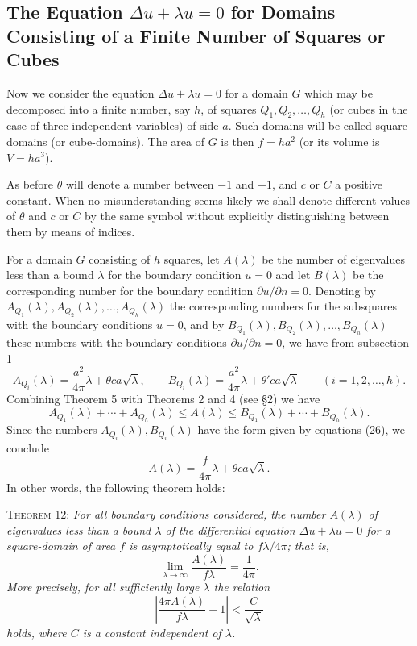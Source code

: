 \subsection{The Equation $\Delta u+\lambda u=0$ for Domains Consisting of a Finite Number of Squares or Cubes}
Now we consider the equation $\Delta u+\lambda u=0$ for a domain $G$ which may be decomposed into a finite number, say $h$, of squares $Q_1,Q_2,\ldots,Q_h$ (or cubes in the case of three independent variables) of side $a$. Such domains will be called square-domains (or cube-domains). The area of $G$ is then $f=ha^2$ (or its volume is $V=ha^3$).

As before $\theta$ will denote a number between $-1$ and $+1$, and $c$ or $C$ a positive constant. When no misunderstanding seems likely we shall denote different values of $\theta$ and $c$ or $C$ by the same symbol without explicitly distinguishing between them by means of indices.

For a domain $G$ consisting of $h$ squares, let $A(\lambda)$ be the number of eigenvalues less than a bound $\lambda$ for the boundary condition $u=0$ and let $B(\lambda)$ be the corresponding number for the boundary condition $\partial u/\partial n=0$. Denoting by $A_{Q_1}(\lambda),A_{Q_2}(\lambda),\ldots,A_{Q_h}(\lambda)$ the corresponding numbers for the subsquares with the boundary conditions $u=0$, and by $B_{Q_1}(\lambda),B_{Q_2}(\lambda),\ldots,B_{Q_h}(\lambda)$ these numbers with the boundary conditions $\partial u/\partial n=0$, we have from subsection 1
\begin{equation}\tag{26}
A_{Q_i}(\lambda)=\frac{a^2}{4\pi}\lambda+\theta ca\sqrt\lambda,
\qquad
B_{Q_i}(\lambda)=\frac{a^2}{4\pi}\lambda+\theta'ca\sqrt\lambda
\qquad(i=1,2,\ldots,h).
\end{equation}
Combining Theorem 5 with Theorems 2 and 4 (see \S2) we have
\[
A_{Q_1}(\lambda)+\cdots+A_{Q_h}(\lambda)\le A(\lambda)
\le B_{Q_1}(\lambda)+\cdots+B_{Q_h}(\lambda).
\]
Since the numbers $A_{Q_i}(\lambda),B_{Q_i}(\lambda)$ have the form given by equations (26), we conclude
\[
A(\lambda)=\frac{f}{4\pi}\lambda+\theta ca\sqrt\lambda.
\]
In other words, the following theorem holds:

\textsc{Theorem 12:} \emph{For all boundary conditions considered, the number $A(\lambda)$ of eigenvalues less than a bound $\lambda$ of the differential equation $\Delta u+\lambda u=0$ for a square-domain of area $f$ is asymptotically equal to $f\lambda/4\pi$; that is,}
\begin{equation}\tag{27}
\lim_{\lambda\to\infty}\frac{A(\lambda)}{f\lambda}=\frac1{4\pi}.
\end{equation}
\emph{More precisely, for all sufficiently large $\lambda$ the relation}
\begin{equation}\tag{28}
\left|\frac{4\pi A(\lambda)}{f\lambda}-1\right|<\frac{C}{\sqrt\lambda}
\end{equation}
\emph{holds, where $C$ is a constant independent of $\lambda$.}

